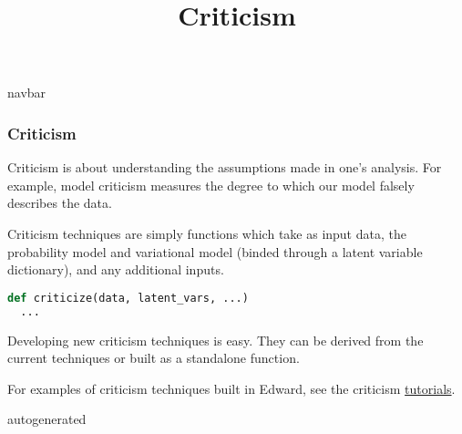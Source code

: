 \title{Criticism}

{{navbar}}

\subsubsection{Criticism}

Criticism is about understanding the
assumptions made in one's analysis. For example, model criticism
measures the degree to which our model falsely describes the data.

Criticism techniques are simply functions which take as input data,
the probability model and variational model (binded through a latent
variable dictionary), and any additional inputs.

\begin{lstlisting}[language=Python]
def criticize(data, latent_vars, ...)
  ...
\end{lstlisting}

Developing new criticism techniques is easy.  They can be derived from
the current techniques or built as a standalone function.

For examples of criticism techniques built in Edward, see the
criticism
\href{/tutorials/}{tutorials}.

{{autogenerated}}
